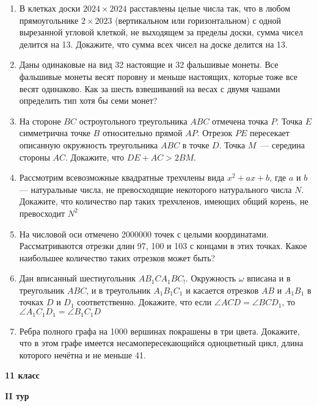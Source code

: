 \documentclass{article}
\begin{document}
\begin{enumerate}[label*=\textbf{\arabic{enumi}.}]
	\setcounter{enumi}{0}
	\item В клетках доски $2024 \times 2024$ расставлены целые числа так, что в любом прямоугольнике $2 \times 2023$ (вертикальном или горизонтальном) с одной вырезанной угловой клеткой, не выходящем за пределы доски, сумма чисел делится на 13. Докажите, что сумма всех чисел на доске делится на 13.
	
	\item Даны одинаковые на вид 32 настоящие и 32 фальшивые монеты. Все фальшивые монеты весят поровну и меньше настоящих, которые тоже все весят одинаково. Как за шесть взвешиваний на весах с двумя чашами определить тип хотя бы семи монет?
	
	\item На стороне $BC$ остроугольного треугольника $ABC$ отмечена точка $P$. Точка $E$ симметрична точке $B$ относительно прямой $AP$. Отрезок $PE$ пересекает описанную окружность треугольника $ABC$ в точке $D$. Точка $M$~--- середина стороны $AC$. Докажите, что $DE + AC > 2BM$.
	
	\item Рассмотрим всевозможные квадратные трехчлены вида $x^2 + ax + b$, где $a$ и $b$ — натуральные числа, не превосходящие некоторого натурального числа $N$. Докажите, что количество пар таких трехчленов, имеющих общий корень, не превосходит $N^2$
	
	\item На числовой оси отмечено 2000000 точек с целыми координатами. Рассматриваются отрезки длин 97, 100 и 103 с концами в этих точках. Какое наибольшее количество таких отрезков может быть?
	
	\item Дан вписанный шестиугольник $AB_1CA_1BC_!$. Окружность $\omega$ вписана и в треугольник $ABC$, и в треугольник $A_1B_1C_1$ и касается отрезков $AB$ и $A_1B_1$ в точках $D$ и $D_1$ соответственно. Докажите, что если $\angle ACD = \angle BCD_1$, то $\angle A_1C_1D_1 = \angle B_1C_1D$
	
	\item Ребра полного графа на 1000 вершинах покрашены в три цвета. Докажите, что в этом графе имеется несамопересекающийся одноцветный цикл, длина которого нечётна и не меньше 41.
\end{enumerate}
\newpage

\begin{center}
	\LARGE\textbf{11 класс}
\end{center}
\begin{center}
	\large\textbf{II тур}
\end{center}
\end{document}

